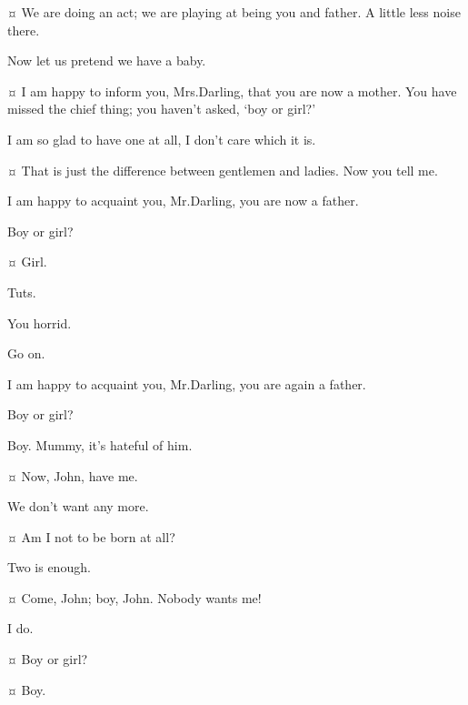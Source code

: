 \begin{drama}
\johnspeaks {}¤
We are doing an act; we are playing at being you and father.
A little less noise there.

\wendyspeaks
Now let us pretend we have a baby.

\johnspeaks {}¤
I am happy to inform you, Mrs.\@ Darling, that you are now a mother.
You have missed the chief thing; you haven’t asked, ‘boy or girl?’

\wendyspeaks
I am so glad to have one at all, I don’t care which it is.

\johnspeaks {}¤
That is just the difference between gentlemen and ladies.
Now you tell me.

\wendyspeaks
I am happy to acquaint you, Mr.\@ Darling, you are now a father.

\johnspeaks
Boy or girl?

\wendyspeaks {}¤
Girl.

\johnspeaks
Tuts.

\wendyspeaks
You horrid.

\johnspeaks
Go on.

\wendyspeaks
I am happy to acquaint you, Mr.\@ Darling, you are again a father.

\johnspeaks
Boy or girl?

\wendyspeaks
Boy.
Mummy, it’s hateful of him.


\michaelspeaks {}¤
Now, John, have me.

\johnspeaks
We don’t want any more.

\michaelspeaks {}¤
Am I not to be born at all?

\johnspeaks
Two is enough.

\michaelspeaks {}¤
Come, John; boy, John.
Nobody wants me!

\mrsdarlingspeaks
I do.

\michaelspeaks {}¤
Boy or girl?

\mrsdarlingspeaks {}¤
Boy.


\end{drama}
